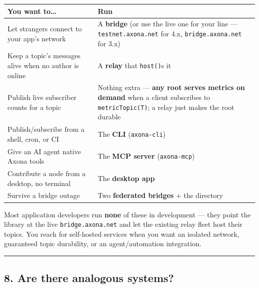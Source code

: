 \documentclass[
  nobib]{tufte-handout}
\newcounter{none} %
\begin{document}
{\def\LTcaptype{none} %
\begin{longtable}[]{@{}
  >{\raggedright\arraybackslash}p{}
  >{\raggedright\arraybackslash}p{}@{}}
\toprule\noalign{}
\begin{minipage}[b]{\linewidth}\raggedright
You want to\ldots{}
\end{minipage} & \begin{minipage}[b]{\linewidth}\raggedright
Run
\end{minipage} \\
\midrule\noalign{}
\endhead
\bottomrule\noalign{}
\endlastfoot
Let strangers connect to your app's network & A \textbf{bridge} (or use
the live one for your line --- \texttt{testnet.axona.net} for 4.x,
\texttt{bridge.axona.net} for 3.x) \\
Keep a topic's messages alive when no author is online & A
\textbf{relay} that \texttt{host()}s it \\
Publish live subscriber counts for a topic & Nothing extra ---
\textbf{any root serves metrics on demand} when a client subscribes to
\texttt{metricTopic(T)}; a relay just makes the root durable \\
Publish/subscribe from a shell, cron, or CI & The \textbf{CLI}
(\texttt{axona-cli}) \\
Give an AI agent native Axona tools & The \textbf{MCP server}
(\texttt{axona-mcp}) \\
Contribute a node from a desktop, no terminal & The \textbf{desktop
app} \\
Survive a bridge outage & Two \textbf{federated bridges} + the
directory \\
\end{longtable}
}

Most application developers run \textbf{none} of these in development
--- they point the library at the live \texttt{bridge.axona.net} and let
the existing relay fleet host their topics. You reach for self-hosted
services when you want an isolated network, guaranteed topic durability,
or an agent/automation integration.

\begin{center}\rule{0.5\linewidth}{0.5pt}\end{center}

\subsection{8. Are there analogous
systems?}\label{are-there-analogous-systems}
\end{document}

